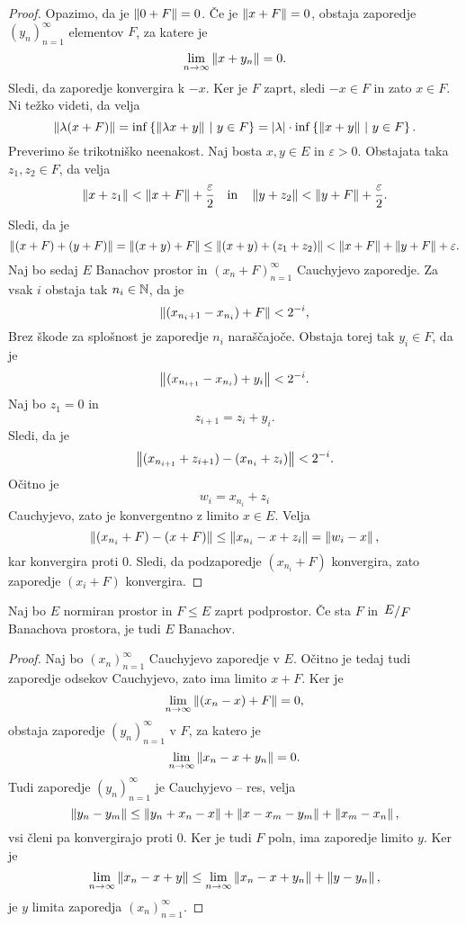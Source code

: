 \begin{proof}
Opazimo, da je $\left\lVert 0 + F\right\rVert = 0$. Če je $\left\lVert x + F\right\rVert = 0$,
obstaja zaporedje $(y_n)_{n=1}^\infty$ elementov $F$, za katere je
\[
\lim_{n \to \infty} \left\lVert x + y_n\right\rVert = 0.
\]
Sledi, da zaporedje konvergira k $-x$. Ker je $F$ zaprt, sledi
$-x \in F$ in zato $x \in F$. Ni težko videti, da velja
\[
\left\lVert \lambda(x + F)\right\rVert =
\inf \left\{\left\lVert \lambda x + y\right\rVert~\middle\vert~y \in F\right\} =
\left\lvert \lambda\right\rvert \cdot \inf \left\{\left\lVert x + y\right\rVert~\middle\vert~y \in F\right\}.
\]
Preverimo še trikotniško neenakost. Naj bosta $x, y \in E$ in
$\varepsilon > 0$. Obstajata taka $z_1, z_2 \in F$, da velja
\[
\left\lVert x + z_1\right\rVert < \left\lVert x + F\right\rVert + \frac{\varepsilon}{2}
\quad \text{in} \quad
\left\lVert y + z_2\right\rVert < \left\lVert y + F\right\rVert + \frac{\varepsilon}{2}.
\]
Sledi, da je
\[
\left\lVert (x+F) + (y+F)\right\rVert =
\left\lVert (x+y) + F\right\rVert \leq
\left\lVert (x+y) + (z_1 + z_2)\right\rVert <
\left\lVert x+F\right\rVert + \left\lVert y+F\right\rVert + \varepsilon.
\]
Naj bo sedaj $E$ Banachov prostor in $(x_n + F)_{n=1}^\infty$
Cauchyjevo zaporedje. Za vsak $i$ obstaja tak $n_i \in \mathbb{N}$, da je
\[
\left\lVert (x_{n_i+1} - x_{n_i}) + F\right\rVert < 2^{-i},
\]
Brez škode za splošnost je zaporedje $n_i$ naraščajoče. Obstaja
torej tak $y_i \in F$, da je
\[
\left\lVert (x_{n_{i+1}} - x_{n_i}) + y_i\right\rVert < 2^{-i}.
\]
Naj bo
$z_1 = 0$ in
\[
z_{i+1} = z_i + y_i.
\]
Sledi, da je
\[
\left\lVert (x_{n_{i+1}} + z_{i+1}) - (x_{n_i} + z_i)\right\rVert < 2^{-i}.
\]
Očitno je
\[
w_i = x_{n_i} + z_i
\]
Cauchyjevo, zato je konvergentno z limito $x \in E$. Velja
\[
\left\lVert (x_{n_i} + F) - (x + F)\right\rVert \leq
\left\lVert x_{n_i} - x + z_i\right\rVert =
\left\lVert w_i - x\right\rVert,
\]
kar konvergira proti $0$. Sledi, da podzaporedje $(x_{n_i} + F)$
konvergira, zato zaporedje $(x_i + F)$ konvergira.
\end{proof}

\begin{trditev}
Naj bo $E$ normiran prostor in $F \leq E$ zaprt podprostor. Če sta
$F$ in $\kvoc{E}{F}$ Banachova prostora, je tudi $E$ Banachov.
\end{trditev}

\begin{proof}
Naj bo $(x_n)_{n=1}^\infty$ Cauchyjevo zaporedje v $E$. Očitno je
tedaj tudi zaporedje odsekov Cauchyjevo, zato ima limito $x + F$.
Ker je
\[
\lim_{n \to \infty} \left\lVert (x_n - x) + F\right\rVert = 0,
\]
obstaja zaporedje $(y_n)_{n=1}^\infty$ v $F$, za katero je
\[
\lim_{n \to \infty} \left\lVert x_n - x + y_n\right\rVert = 0.
\]
Tudi zaporedje $(y_n)_{n=1}^\infty$ je Cauchyjevo -- res, velja
\[
\left\lVert y_n - y_m\right\rVert \leq \left\lVert y_n + x_n - x\right\rVert +
\left\lVert x - x_m - y_m\right\rVert + \left\lVert x_m - x_n\right\rVert,
\]
vsi členi pa konvergirajo proti $0$. Ker je tudi $F$ poln, ima
zaporedje limito $y$. Ker je
\[
\lim_{n \to \infty} \left\lVert x_n - x + y\right\rVert \leq
\lim_{n \to \infty} \left\lVert x_n - x + y_n\right\rVert + \left\lVert y - y_n\right\rVert,
\]
je $y$ limita zaporedja $(x_n)_{n=1}^\infty$.
\end{proof}

